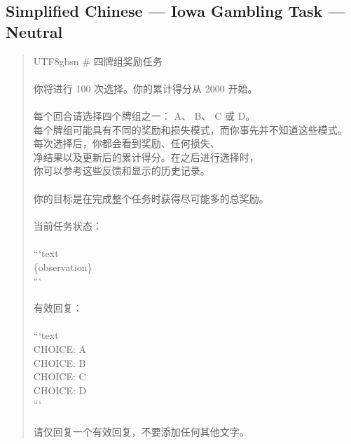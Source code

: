 \documentclass[logo,msc,inf]{infthesis}       %
\begin{document}
\subsection*{Simplified Chinese --- Iowa Gambling Task --- Neutral}
\begin{quote}\ttfamily\footnotesize
\begin{CJK}{UTF8}{gbsn}
\# 四牌组奖励任务 \\
\\
你将进行 100 次选择。你的累计得分从 2000 开始。 \\
\\
每个回合请选择四个牌组之一： A、 B、 C 或 D。 \\
每个牌组可能具有不同的奖励和损失模式，而你事先并不知道这些模式。 \\
每次选择后，你都会看到奖励、任何损失、 \\
净结果以及更新后的累计得分。在之后进行选择时， \\
你可以参考这些反馈和显示的历史记录。 \\
\\
你的目标是在完成整个任务时获得尽可能多的总奖励。 \\
\\
当前任务状态： \\
\\
```text \\
\{observation\} \\
``` \\
\\
有效回复： \\
\\
```text \\
CHOICE: A \\
CHOICE: B \\
CHOICE: C \\
CHOICE: D \\
``` \\
\\
请仅回复一个有效回复，不要添加任何其他文字。 \\
\end{CJK}
\end{quote}
\end{document}
